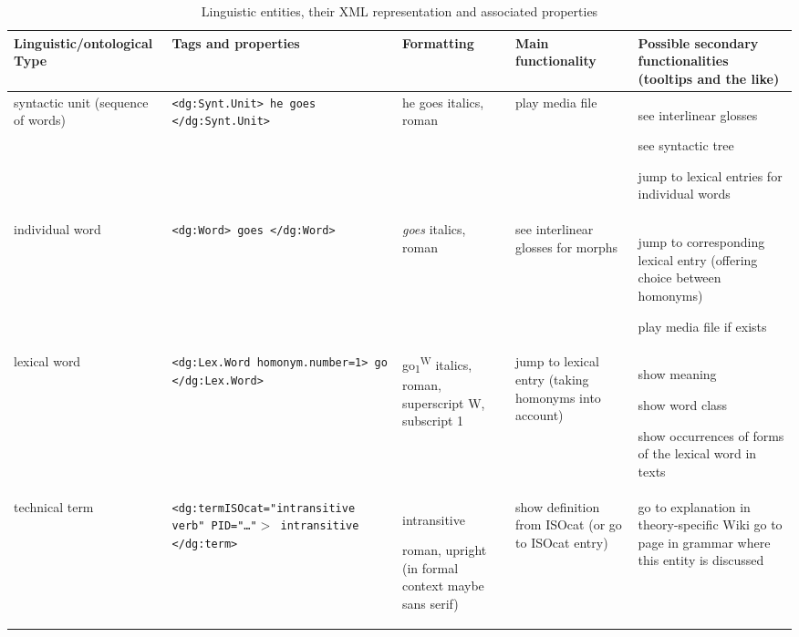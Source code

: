 \begin{sidewaystable}
\begin{tabular}{p{2.5cm}p{4.5cm}p{3cm}p{2.5cm}p{4cm}}
\hline
  Linguistic/\newline ontological Type  &
  Tags and properties  &
  Formatting  &
  Main functionality  &
  Possible secondary functionalities\newline
 (tooltips and the like) \\\hline
  syntactic unit\newline
(sequence of words)  &
\texttt{<dg:Synt.Unit>\newline
 he goes \newline
</dg:Synt.Unit>}  &
 he goes 
 italics, roman &
  play \newline
media file &
see interlinear glosses 

see syntactic tree 

jump to lexical entries for individual words\\\hline
 individual word &
\texttt{<dg:Word>\newline
goes\newline
</dg:Word>}  &
  \textit{goes}
 italics, roman &
  see interlinear glosses for morphs &
jump to corresponding lexical entry (offering choice between homonyms)

play media file if exists\\\hline
  lexical word &
\texttt{<dg:Lex.Word  homonym.number=1>\newline
go\newline
</dg:Lex.Word>} &
 go\textsubscript{1}\textsuperscript{W}
 italics, roman, superscript W, subscript 1 &
 jump to lexical entry
 (taking homonyms into account) &
show meaning 

show word class

show occurrences\newline
of forms of the lexical word in texts\\\hline
  technical term &
\texttt{<dg:term\newline ISOcat="intransitive verb" PID="{\dots}"$>$\newline
intransitive\newline
</dg:term>} &
 intransitive 

 roman, upright\newline
(in formal context maybe sans serif) &
{show definition from ISOcat\newline
(or go to ISOcat entry)} &
go to explanation in theory-specific Wiki
go to page in grammar where this entity is discussed\\\hline
\end{tabular}
\caption{Linguistic entities, their XML representation and associated properties}
\label{drude:tab:1}
\end{sidewaystable}

